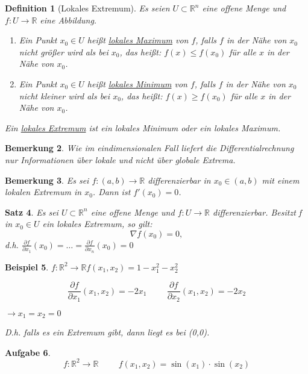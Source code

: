 \documentclass[12pt,a4paper]{scrreprt}
\newtheorem{defi}{Definition}[section]
\newtheorem{bemerkung}[defi]{Bemerkung}
\newtheorem{beispiel}[defi]{Beispiel}
\newtheorem{satz}[defi]{Satz}
\newtheorem{aufg}[defi]{Aufgabe}
\begin{document}
\begin{defi}[Lokales Extremum]
	Es seien $U\subset\mathbb{R}^n$ eine offene Menge und $f:U\to\mathbb{R}$ eine Abbildung.
	\begin{enumerate}[label=(\roman*)]
		\item Ein Punkt $x_0\in U$ heißt \underline{lokales Maximum} von $f$, falls $f$ in der Nähe von $x_0$ nicht größer wird als bei $x_0$, das heißt:
		$f(x)\le f(x_0)$ für alle $x$ in der Nähe von $x_0$.
		\item Ein Punkt $x_0\in U$ heißt \underline{lokales Minimum} von $f$, falls $f$ in der Nähe von $x_0$ nicht kleiner wird als bei $x_0$, das heißt:
		$f(x)\ge f(x_0)$ für alle $x$ in der Nähe von $x_0$.
	\end{enumerate}
	Ein \underline{lokales Extremum} ist ein lokales Minimum oder ein lokales Maximum.
\end{defi}

\begin{bemerkung}
	Wie im eindimensionalen Fall liefert die Differentialrechnung nur Informationen über lokale und nicht über globale Extrema.
\end{bemerkung}

\begin{bemerkung}
	Es sei $f:(a,b)\to\mathbb{R}$ differenzierbar in $x_0\in (a,b)$ mit einem lokalen Extremum in $x_0$. Dann ist $f'(x_0)=0$.
\end{bemerkung}

\begin{satz}
	Es sei $U \subset \mathbb{R}^n$ eine offene Menge und $f:U\to\mathbb{R}$ differenzierbar. Besitzt f in $x_0\in U$ ein lokales Extremum, so gilt:
	\[\nabla f(x_0)=0,\]
	d.h. $\frac{\partial f}{\partial x_1}(x_0)=\dots=\frac{\partial f}{\partial x_n}(x_0)=0$
\end{satz}

\begin{beispiel}
	$f:\mathbb{R}^2\to\mathbb{R}$\hspace{1cm}$f(x_1,x_2)=1-x_1^2-x_2^2$
	
	\[\frac{\partial f}{\partial x_1}(x_1,x_2)=-2x_1\hspace{1cm}\frac{\partial f}{\partial x_2}(x_1,x_2)=-2x_2\]
	
	$\to x_1=x_2=0$
	
	D.h. falls es ein Extremum gibt, dann liegt es bei (0,0).
\end{beispiel}

\begin{aufg}
	\[f:\mathbb{R}^2\to\mathbb{R}\hspace{1cm}f(x_1,x_2)=\sin(x_1)\cdot\sin(x_2)\]
\end{aufg}
\end{document}

